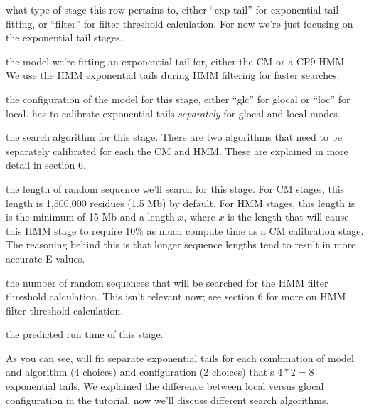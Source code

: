 \begin{wideitem}
\item[\emprog{stage}] 
  what type of stage this row pertains to, either
  ``exp tail'' for exponential tail fitting, or ``filter'' for filter
  threshold calculation. For now we're just focusing on the exponential tail
  stages. 

\item[\emprog{mod}] 
  the model we're fitting an exponential tail for,
  either the CM or a CP9 HMM. We use the HMM exponential tails during
  HMM filtering for faster searches.
  
\item[\emprog{cfg}] 
  the configuration of the model for this stage,
  either ``glc'' for glocal or ``loc'' for local. 
  has to calibrate exponential tails \emph{separately} for glocal and
  local modes.

\item[\emprog{alg}] 
  the search algorithm for this stage. There are two
  algorithms that need to be separately calibrated for each the CM and
  HMM. These are explained in more detail in section 6.

\item[\emprog{expL}] 
  the length of random sequence we'll search for
  this stage. For CM stages, this length is 1,500,000 residues (1.5 Mb)
  by default. For HMM stages, this length is is the minimum
  of 15 Mb and a length $x$, where $x$ is the length that will cause
  this HMM stage to require 10\% as much compute time as a CM
  calibration stage. The reasoning behind this is that longer sequence
  lengths tend to result in more accurate E-values.

\item[\emprog{filN}] 
  the number of random sequences that will be
  searched for the HMM filter threshold calculation. This isn't
  relevant now; see section 6 for more on HMM filter threshold
  calculation. 

\item[\emprog{predicted time}] 
  the predicted run time of this stage. 

\end{wideitem}


As you can see,  will fit separate exponential tails
for each combination of model and algorithm (4 choices) and configuration
(2 choices) that's $4*2=8$ exponential
tails. We explained the difference between local versus glocal
configuration in the tutorial, now we'll discuss different search algorithms. 


